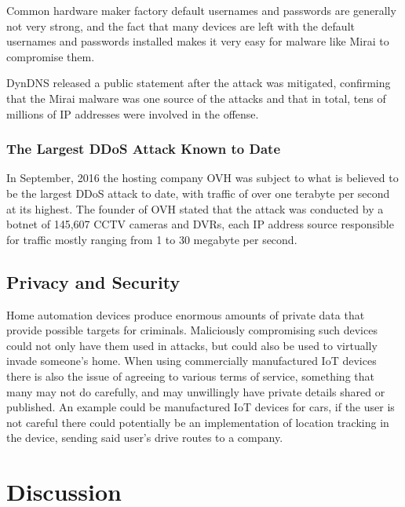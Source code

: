 \documentclass[a4paper, conference]{IEEEtran/IEEEtran}
\begin{document}
Common hardware maker factory default usernames and passwords are generally not very strong, and the fact that many devices are left with the default usernames and passwords installed makes it very easy for malware like Mirai to compromise them.\cite{whomakes}

DynDNS released a public statement after the attack was mitigated, confirming that the Mirai malware was one source of the attacks and that in total, tens of millions of IP addresses were involved in the offense.\cite{dynstatement}

\subsubsection{The Largest DDoS Attack Known to Date}
In September, 2016 the hosting company OVH was subject to what is believed to be the largest DDoS attack to date, with traffic of over one terabyte per second at its highest.\cite{scmagazine} The founder of OVH stated that the attack was conducted by a botnet of 145,607 CCTV cameras and DVRs, each IP address source responsible for traffic mostly ranging from 1 to 30 megabyte per second.

\subsection{Privacy and Security}
Home automation devices produce enormous amounts of private data that provide possible targets for criminals. Maliciously compromising such devices could not only have them used in attacks, but could also be used to virtually invade someone's home. When using commercially manufactured IoT devices there is also the issue of agreeing to various terms of service, something that many may not do carefully, and may unwillingly have private details shared or published. An example could be manufactured IoT devices for cars, if the user is not careful there could potentially be an implementation of location tracking in the device, sending said user's drive routes to a company.\cite{meola}

\section{Discussion}
\end{document}
